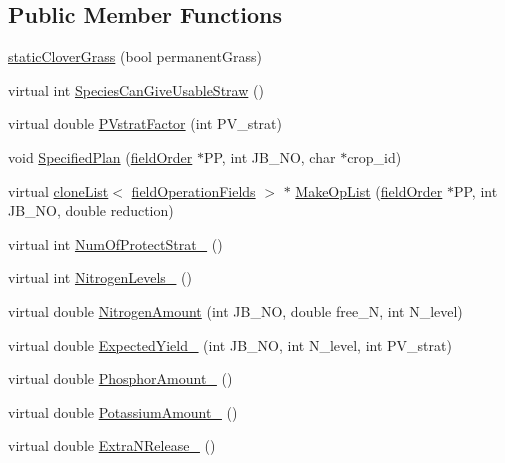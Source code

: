 \subsection*{Public Member Functions}
\begin{DoxyCompactItemize}
\item 
\hyperlink{classstatic_clover_grass_a2a75c00ffc15dccb394517f789ea51a7}{staticCloverGrass} (bool permanentGrass)
\item 
virtual int \hyperlink{classstatic_clover_grass_aaaa2e0c87530fc75182dbdcd2dac4571}{SpeciesCanGiveUsableStraw} ()
\item 
virtual double \hyperlink{classstatic_clover_grass_a2eb39c57d3165893587edade1a470342}{PVstratFactor} (int PV\_\-strat)
\item 
void \hyperlink{classstatic_clover_grass_a737916e73dc4466b5bc7c53013a4895e}{SpecifiedPlan} (\hyperlink{classfield_order}{fieldOrder} $\ast$PP, int JB\_\-NO, char $\ast$crop\_\-id)
\item 
virtual \hyperlink{classclone_list}{cloneList}$<$ \hyperlink{classfield_operation_fields}{fieldOperationFields} $>$ $\ast$ \hyperlink{classstatic_clover_grass_a109415e46a73076fa9b573f273aab284}{MakeOpList} (\hyperlink{classfield_order}{fieldOrder} $\ast$PP, int JB\_\-NO, double reduction)
\item 
virtual int \hyperlink{classstatic_clover_grass_a2361fc85251a91cf8f1d1c7930392323}{NumOfProtectStrat\_\-} ()
\item 
virtual int \hyperlink{classstatic_clover_grass_a847d7d5346d43b21712110c1f73f5b4d}{NitrogenLevels\_\-} ()
\item 
virtual double \hyperlink{classstatic_clover_grass_a751ba37577ff9a5fe44fb4cd0c3b62f2}{NitrogenAmount} (int JB\_\-NO, double free\_\-N, int N\_\-level)
\item 
virtual double \hyperlink{classstatic_clover_grass_a17e80290c27da7304243f8ac3211631f}{ExpectedYield\_\-} (int JB\_\-NO, int N\_\-level, int PV\_\-strat)
\item 
virtual double \hyperlink{classstatic_clover_grass_a3ab4d1c458661d02bc92b991ce2e4c15}{PhosphorAmount\_\-} ()
\item 
virtual double \hyperlink{classstatic_clover_grass_a4503f83751d06364054bc14d0b7221db}{PotassiumAmount\_\-} ()
\item 
virtual double \hyperlink{classstatic_clover_grass_adc4ac213c2bf4b59ad590a634d13ff4a}{ExtraNRelease\_\-} ()
\end{DoxyCompactItemize}

